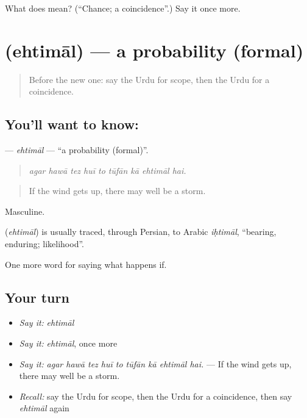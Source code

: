 \begin{tcolorbox}[breakable,colback=teal!4,colframe=teal!35!black,title={Before you move on}]
What does  mean? (\textquotedblleft{}Chance; a coincidence\textquotedblright{}.) Say it once more.
\end{tcolorbox}
\section[\texorpdfstring{\ur{احتمال} (ehtimāl)}{احتمال (ehtimāl)}]{ (ehtimāl) — a probability (formal)}

\label{lesson:UR-C361-ehtimal}



\begin{quote}
Before the new one: say the Urdu for scope, then the Urdu for a coincidence.
\end{quote}

\subsection*{You'll want to know: }
\textbf{} — \emph{ehtimāl} — \textquotedblleft{}a probability (formal)\textquotedblright{}.

\begin{quote}
        
\end{quote}

\begin{quote}
\emph{agar hawā tez huī to tūfān kā ehtimāl hai.}
\end{quote}

\begin{quote}
If the wind gets up, there may well be a storm.
\end{quote}

Masculine.

\begin{cousinweb}
\textbf{} (\emph{ehtimāl}) is usually traced, through Persian, to Arabic \emph{iḥtimāl}, \textquotedblleft{}bearing, enduring; likelihood\textquotedblright{}.
\end{cousinweb}

\begin{grammarlens}[title={What you've built}]
One more word for saying what happens if.
\end{grammarlens}

\subsection*{Your turn}
\begin{itemize}
\raggedright
  \item \emph{Say it:} \emph{ehtimāl}
  \item \emph{Say it:} \emph{ehtimāl}, once more
  \item \emph{Say it:} \emph{agar hawā tez huī to tūfān kā ehtimāl hai.} — If the wind gets up, there may well be a storm.
  \item \emph{Recall:} say the Urdu for scope, then the Urdu for a coincidence, then say \emph{ehtimāl} again
\end{itemize}

